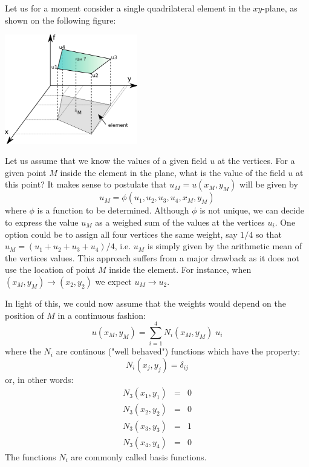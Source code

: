 Let us for a moment consider a single quadrilateral element in the $xy$-plane, 
as shown on the following figure:
\begin{center}
\includegraphics[width=5.8cm]{images/shape.png}
\end{center}
Let us assume that we know the values of a given field $u$ at the vertices.
For a given point $M$ inside the element in the plane, what is the value of the 
field $u$ at this point?
It makes sense to postulate that $u_M=u(x_M,y_M)$ will be given  by 
\[
u_M= \phi(u_1,u_2,u_3,u_4,x_M,y_M) 
\]
where $\phi$ is a function to be determined. Although $\phi$ is not unique, we can 
decide to express the value $u_M$ as a weighed sum of the values at the vertices $u_i$.
One option could be to assign all four vertices the same weight, say $1/4$ so that 
$u_M=(u_1+u_2+u_3+u_4)/4$, i.e. $u_M$ is simply given by the arithmetic mean 
of the vertices values. This approach suffers from a major drawback as it does
not use the location of point $M$ inside the element. For instance, when 
$(x_M,y_M) \rightarrow (x_2,y_2)$ we expect $u_M \rightarrow u_2$.

In light of this, we could now assume that the weights would depend on the position 
of $M$ in a continuous fashion:
\[
u(x_M,y_M) = \sum_{i=1}^4 N_i(x_M,y_M)\;  u_i
\]
where the $N_i$ are continous ("well behaved") functions which have the property:
\[
N_i(x_j,y_j)=\delta_{ij}
\]
or, in other words: 
\begin{eqnarray}
N_3(x_1,y_1) &=& 0 \\
N_3(x_2,y_2) &=& 0 \\
N_3(x_3,y_3) &=& 1 \\
N_3(x_4,y_4) &=& 0 
\end{eqnarray}
The functions $N_i$ are commonly called basis functions. 

